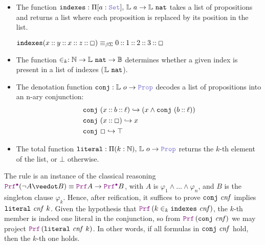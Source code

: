 \begin{itemize}
  \item The function $\kw{indexes}: \Pi [a: \set],\, \bb{L}~a \ra \bb{L}~\kw{nat}$  takes a list of propositions and returns a list where each proposition is replaced by its position in the list.
  
  \begin{example}[indexes]
  \(
    \mathop{\mathtt{indexes}} (x \mathbin{\mathbin{::}} y \mathbin{\mathbin{::}} x  \mathbin{\mathbin{::}} z \mathbin{\mathbin{::}} \Box) \equiv_{\beta\Sigma} 0 \mathbin{\mathbin{::}} 1 \mathbin{\mathbin{::}} 2 \mathbin{\mathbin{::}} 3 \mathbin{\mathbin{::}} \Box
  \)
  \end{example}
  \item The function $\in_k : \mathbb{N} \rightarrow \mathbb{L}~\texttt{\upshape{nat}} \rightarrow \mathbb{B}$  determines whether a given index is present in a list of indexes ($\mathbb{L}~\texttt{\upshape{nat}}$).
  \item The denotation function $\kw{conj}: \bb{L}~o \ra \prop$ decodes a list of propositions into an n-ary conjunction:
  \[
    \begin{aligned}
    & \texttt{\upshape{conj}}~(x \mathbin{::} b \mathbin{::} \ell) \hookrightarrow (x \land \texttt{\upshape{conj}}~(b \mathbin{::} \ell))\\
    & \texttt{\upshape{conj}}~(x \mathbin{::} \Box) \hookrightarrow x\\
    & \texttt{\upshape{conj}}~\Box \hookrightarrow \top
    \end{aligned}
    \]
  \item The total function $\kw{literal}: \Pi (k: \N),\, \bb{L}~o \ra \prop$ returns the $k$-th element of the list, or $\bot$ otherwise.
\end{itemize}

The rule  is an instance of the classical reasoning \(\prfcl (\neg A \veedot B) \equiv \prf A \ra \prfcl B\),
with $A$ is $\varphi_1 \land \dots \land \varphi_n$, and $B$ is the singleton clause $\varphi_k$.
Hence, after reification, it suffices to prove $\texttt{\upshape{conj}}~\mathit{cnf}$ implies $\texttt{\upshape{literal}}~\mathit{cnf}~k$.
Given the hypothesis that \(\prf\,(k \in_k \kw{indexes}~\mathit{cnf})\), the $k$-th member is indeed one literal in the conjunction, so from \(\prf\,(\kw{conj}~\mathit{cnf})\) we may project \(\prf\,(\kw{literal}~\mathit{cnf}~k)\).
In other words, if all formulas in \(\texttt{\upshape{conj}}~\mathit{cnf}\) hold, then the $k$-th one holds.

